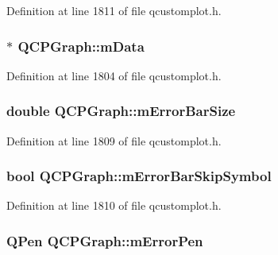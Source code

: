 Definition at line 1811 of file qcustomplot.\-h.

\hypertarget{class_q_c_p_graph_a8457c840f69a0ac49f61d30a509c5d08}{
\subsubsection[{m\-Data}]{$\ast$ Q\-C\-P\-Graph\-::m\-Data\hspace{0.3cm}{\ttfamily [protected]}}}\label{class_q_c_p_graph_a8457c840f69a0ac49f61d30a509c5d08}


Definition at line 1804 of file qcustomplot.\-h.

\hypertarget{class_q_c_p_graph_a7b51c8d09510f9d195b5e765ccbcf05b}{
\subsubsection[{m\-Error\-Bar\-Size}]{\setlength{\rightskip}{0pt plus 5cm}double Q\-C\-P\-Graph\-::m\-Error\-Bar\-Size\hspace{0.3cm}{\ttfamily [protected]}}}\label{class_q_c_p_graph_a7b51c8d09510f9d195b5e765ccbcf05b}


Definition at line 1809 of file qcustomplot.\-h.

\hypertarget{class_q_c_p_graph_acf631d7dbd1055a69ab3b63094868557}{
\subsubsection[{m\-Error\-Bar\-Skip\-Symbol}]{\setlength{\rightskip}{0pt plus 5cm}bool Q\-C\-P\-Graph\-::m\-Error\-Bar\-Skip\-Symbol\hspace{0.3cm}{\ttfamily [protected]}}}\label{class_q_c_p_graph_acf631d7dbd1055a69ab3b63094868557}


Definition at line 1810 of file qcustomplot.\-h.

\hypertarget{class_q_c_p_graph_aa35681a24165c2831301091a87b662ce}{
\subsubsection[{m\-Error\-Pen}]{\setlength{\rightskip}{0pt plus 5cm}Q\-Pen Q\-C\-P\-Graph\-::m\-Error\-Pen\hspace{0.3cm}{\ttfamily [protected]}}}\label{class_q_c_p_graph_aa35681a24165c2831301091a87b662ce}


